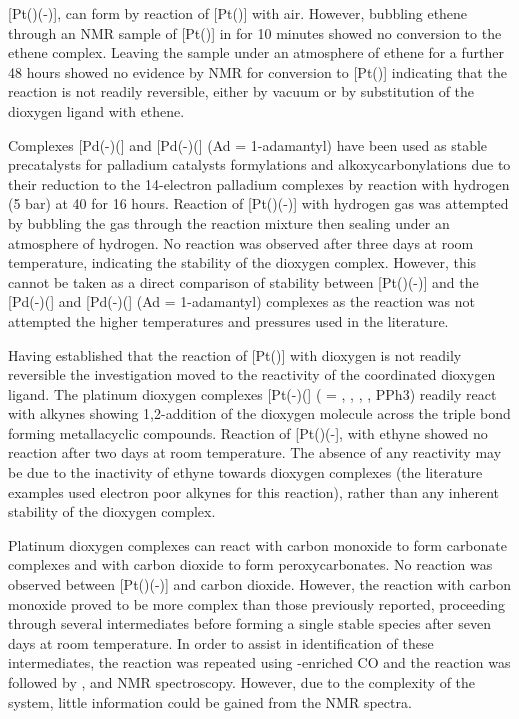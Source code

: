 [Pt(\tButhixantphos)(-)], can form by reaction of [Pt(\tButhixantphos)] with air.  However, bubbling ethene through an NMR sample of [Pt(\tButhixantphos)] in  for 10 minutes showed no conversion to the ethene complex.  Leaving the sample under an atmosphere of ethene for a further 48 hours showed no evidence by NMR for conversion to [Pt(\tButhixantphos)] indicating that the reaction is not readily reversible, either by vacuum or by substitution of the dioxygen ligand with ethene.  

Complexes [Pd(-)(] and [Pd(-)(] (Ad = 1-adamantyl) have been used as stable precatalysts for palladium catalysts formylations and alkoxycarbonylations due to their reduction to the 14-electron palladium complexes by reaction with hydrogen (5 bar) at 40\degC{} for 16 hours.\cite{Sergeev2010}  Reaction of [Pt(\tButhixantphos)(-)] with hydrogen gas was attempted by bubbling the gas through the reaction mixture then sealing under an atmosphere of hydrogen.  No reaction was observed after three days at room temperature, indicating the stability of the dioxygen complex.  However, this cannot be taken as a direct comparison of stability between [Pt(\tButhixantphos)(-)] and the [Pd(-)(] and [Pd(-)(] (Ad = 1-adamantyl) complexes as the reaction was not attempted the higher temperatures and pressures used in the literature.\cite{Sergeev2010}

Having established that the reaction of [Pt(\tButhixantphos)] with dioxygen is not readily reversible the investigation moved to the reactivity of the coordinated dioxygen ligand.  The platinum dioxygen complexes [Pt(-)(] ( = , , , , PPh3) readily react with alkynes showing 1,2-addition of the dioxygen molecule across the triple bond forming metallacyclic compounds\cite{Clark1978}.  Reaction of [Pt(\tButhixantphos)(-], with ethyne showed no reaction after two days at room temperature.  The absence of any reactivity may be due to the inactivity of ethyne towards dioxygen complexes (the literature examples used electron poor alkynes for this reaction), rather than any inherent stability of the dioxygen complex.  

Platinum dioxygen complexes can react with carbon monoxide to form carbonate complexes and with carbon dioxide to form peroxycarbonates.\cite{Goel1983b}  No reaction was observed between [Pt(\tButhixantphos)(-)] and carbon dioxide.  However, the reaction with carbon monoxide proved to be more complex than those previously reported, proceeding through several intermediates before forming a single stable species after seven days at room temperature.  In order to assist in identification of these intermediates, the reaction was repeated using \carbon{}-enriched CO and the reaction was followed by \proton{}, \carbon{} and \phosphorus{} NMR spectroscopy.  However, due to the complexity of the system, little information could be gained from the \proton{} NMR spectra.  

